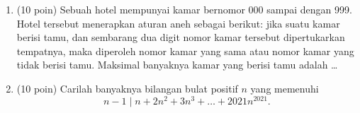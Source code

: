 \documentclass[11pt]{scrartcl}
\begin{document}
\begin{enumerate}
	    \item (10 poin) Sebuah hotel mempunyai kamar bernomor 000 sampai dengan 999. Hotel tersebut menerapkan aturan aneh sebagai berikut: jika suatu kamar berisi tamu, dan sembarang dua digit nomor kamar tersebut dipertukarkan tempatnya, maka diperoleh nomor kamar yang sama atau nomor kamar yang tidak berisi tamu. Maksimal banyaknya kamar yang berisi tamu adalah \dots
	    
	    \item (10 poin) Carilah banyaknya bilangan bulat positif $n$ yang memenuhi 
	    $$n-1 \mid n+2n^2+3n^3+\dots+2021n^{2021}.$$
	\end{enumerate}
	
\end{document}
